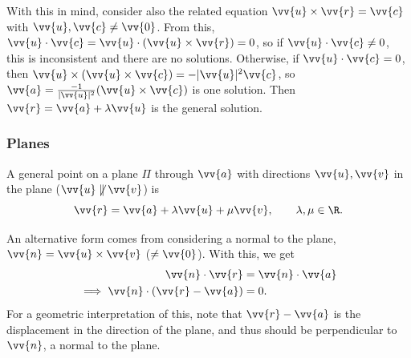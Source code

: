 With this in mind, consider also the related equation $\vv{u} \times \vv{r} = \vv{c}$ with $\vv{u}, \vv{c} \neq \vv{0}$. From this, $\vv{u} \cdot \vv{c} = \vv{u} \cdot (\vv{u} \times \vv{r}) = 0$, so if $\vv{u} \cdot \vv{c} \neq 0$, this is inconsistent and there are no solutions. Otherwise, if $\vv{u} \cdot \vv{c}= 0$, then $\vv{u} \times (\vv{u} \times \vv{c}) = -|\vv{u}|^2 \vv{c}$, so $\vv{a} = \frac{-1}{|\vv{u}|^2}(\vv{u} \times \vv{c})$ is one solution. Then $\vv{r} = \vv{a} + \lambda \vv{u}$ is the general solution.


\subsubsection{Planes}

A general point on a plane $\Pi$ through $\vv{a}$ with directions $\vv{u}, \vv{v}$ in the plane ($\vv{u} \not \parallel \vv{v}$) is
$$
\vv{r} = \vv{a} + \lambda \vv{u} + \mu \vv{v}, \quad \quad \lambda, \mu \in \R.
$$

\begin{center}
\end{center}

An alternative form comes from considering a normal to the plane, $\vv{n}= \vv{u} \times \vv{v}$ ($\neq \vv{0}$). With this, we get
\begin{align*}
    \vv{n} \cdot \vv{r} &= \vv{n} \cdot \vv{a}  \\
\implies   \vv{n} \cdot (\vv{r} - \vv{a}) &= 0.
\end{align*}
For a geometric interpretation of this, note that $\vv{r} - \vv{a}$ is the displacement in the direction of the plane, and thus should be perpendicular to $\vv{n}$, a normal to the plane.

